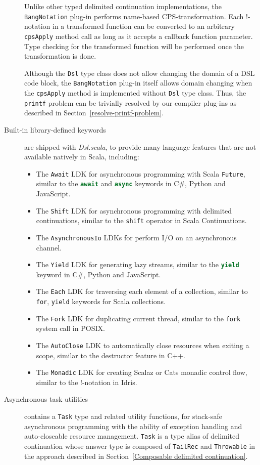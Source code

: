 \begin{description}
  Unlike other typed delimited continuation implementations, the \lstinline{BangNotation} plug-in performs name-based CPS-transformation. Each !-notation in a transformed function can be converted to an arbitrary \lstinline{cpsApply} method call as long as it accepts a callback function parameter. Type checking for the transformed function will be performed once the transformation is done.

  Although the \lstinline{Dsl} type class does not allow changing the domain of a DSL code block, the \lstinline{BangNotation} plug-in itself allows domain changing when the \lstinline{cpsApply} method is implemented without \lstinline{Dsl} type class. Thus, the \lstinline{printf} problem can be trivially resolved by our compiler plug-ins as described in Section~\ref{resolve-printf-problem}.
  \item[Built-in library-defined keywords] are shipped with \textit{Dsl.scala}, to provide many language features that are not available natively in Scala, including:
  \begin{itemize}
    \item The \lstinline{Await} LDK for asynchronous programming with Scala \lstinline{Future}, similar to the \lstinline[language=Python,style=Python3]{await} and \lstinline[language=Python,style=Python3]{async} keywords in C\#, Python and JavaScript.
    \item The \lstinline{Shift} LDK for asynchronous programming with delimited continuations, similar to the \lstinline{shift} operator in Scala Continuations.
    \item The \lstinline{AsynchronousIo} LDKs for perform I/O on an asynchronous channel.
    \item The \lstinline{Yield} LDK for generating lazy streams, similar to the \lstinline[language=Python,style=Python3]{yield} keyword in C\#, Python and JavaScript.
    \item The \lstinline{Each} LDK for traversing each element of a collection, similar to \lstinline{for}, \lstinline{yield} keywords for Scala collections.
    \item The \lstinline{Fork} LDK for duplicating current thread, similar to the \lstinline{fork} system call in POSIX.
    \item The \lstinline{AutoClose} LDK to automatically close resources when exiting a scope, similar to the destructor feature in C++.
    \item The \lstinline{Monadic} LDK for creating Scalaz \cite{kenji2017scalaz} or Cats \cite{typelevel2017cats} monadic control flow, similar to the !-notation in Idris\cite{brady2013idris}.
  \end{itemize}
  \item[Asynchronous task utilities] contains a \lstinline{Task} type and related utility functions, for stack-safe asynchronous programming with the ability of exception handling and auto-closeable resource management. \lstinline{Task} is a type alias of delimited continuation whose answer type is composed of \lstinline{TailRec} and \lstinline{Throwable} in the approach described in Section~\ref{Composable delimited continuation}.


\end{description}
